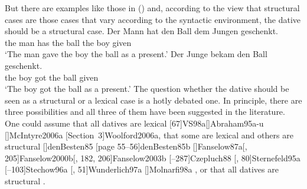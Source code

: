 But there are examples like those in () and, according to the view that structural cases are
those cases that vary according to the syntactic environment, the dative should be a structural case.
\eal
\ex 
\gll Der Mann  hat   den Ball dem Jungen geschenkt.\\
     the man   has   the ball the boy given\\
\glt `The man gave the boy the ball as a present.'
\ex 
\gll Der Junge bekam den Ball geschenkt.\\
     the boy   got   the ball given\\   
\glt `The boy got the ball as a present.'
\zl
The question whether the dative should be seen as a structural or a lexical case is a hotly debated
one. In principle, there are three possibilities and all three of them have been suggested in the
literature. One could assume that all datives are lexical 
\parencites[]{Haider85b}%
[]{Haider86}[, 217, 228]{HM94a}%
{Mueller99a,Mueller2001a}[]{Mueller2003e}%
[]{Scherpenisse86a}%
[, 291]{Pollard94a}%
[67]{VS98a}[]{Abraham95a-u}%
[]{McIntyre2006a}%
[Section~3]{Woolford2006a},
that some are lexical and others are structural 
\parencites
{Wegener85a}%
{Wegener90}%
[]{denBesten85}%
[page 55--56]{denBesten85b}%
[]{Fanselow87a}[, 205]{Fanselow2000b}[, 182, 206]{Fanselow2003b}%
[--287]{Czepluch88}%
[, 80]{Sternefeld95a}%
[--103]{Stechow96a}%
[, 51]{Wunderlich97a}%
[]{Molnarfi98a}%
, or that all datives are structural 
\parencites[]{Sternefeld95a}%
[, 205--206]{Ryu97a}%
[--97]{Gunkel2003b}.%

